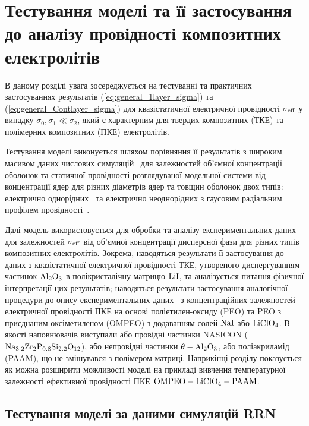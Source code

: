 \documentclass[14pt,twoside]{vakthesis}
\begin{document}
\chapter{Тестування моделі та її застосування до аналізу провідності композитних електролітів}\label{sec:RRN-electrol}

В даному розділі увага зосереджується на тестуванні та практичних застосуваннях результатів (\ref{eq:general_1layer_sigma}) та (\ref{eq:general_Contlayer_sigma}) для квазістатичної електричної провідності $\sigma_{\rm eff}$ у випадку $\sigma_{0}, \sigma_1 \ll \sigma_2$, який є характерним для твердих композитних (ТКЕ) та полімерних композитних (ПКЕ) електролітів.

Тестування моделі виконується шляхом порівняння її результатів з широким масивом даних числових симуляцій~\cite{Siekierski2005, Siekierski2006, Siekierski2007} для залежностей об'ємної концентрації оболонок та статичної провідності розглядуваної модельної системи від концентрації ядер для різних діаметрів ядер та товщин оболонок двох типів: електрично однорідних~\cite{Siekierski2005, Siekierski2007} та електрично неоднорiдних з гаусовим радіальним профілем провідності~\cite{Siekierski2006}.

Далі модель використовується для обробки та аналізу експериментальних даних для залежностей $\sigma_{\rm eff}$ від об'ємної концентрації дисперсної фази для різних типів композитних електролітів. Зокрема, наводяться результати її застосування до даних \cite{Liang1973} з квазістатичної електричної провідності ТКЕ, утвореного диспергуванням частинок $\rm Al_2O_3$ в полікристалічну матрицю $\rm LiI$, та аналізується питання фізичної інтерпретації цих результатів;
наводяться результати застосування аналогічної процедури до опису експериментальних даних~\cite{Przl1995, Wiec1994} з концентраційних залежностей електричної провідності ПКЕ на основі поліетилен-оксиду (PEO) та PEO з приєднаним оксіметиленом (OMPEO) з додаванням солей $\rm NaI$ або $\rm LiClO_4$. В якості наповнювачів виступали або провідні частинки NASICON ($\rm Na_{3.2} Zr_2P_{0.8} Si_{2.2} O_{12}$), або непровідні частинки $\rm \theta -Al_2O_3$, або поліакриламід (PAAM), що не змішувався з полімером матриці. Наприкінці розділу показується як можна розширити можливості моделі на прикладі вивчення температурної залежності ефективної провідності ПКЕ $\rm OMPEO-LiClO_4-PAAM$.



\section{Тестування моделі за даними симуляцій RRN}\label{sec:RRN-test}
\end{document}
